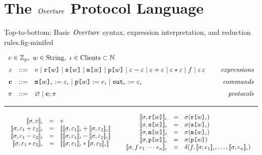 \section{The $\mathit{Overture}$ Protocol Language}

\begin{fpfig}[t]{Top-to-bottom: Basic $\mathit{Overture}$ syntax, expression interpretation, and reduction rules.}{fig-minifed}
  {
    $$
    \begin{array}{rcl@{\hspace{8mm}}r}
      \multicolumn{4}{l}{v \in \mathbb{Z}_p,\ w \in \mathrm{String},\ \cid \in \mathrm{Clients} \subset  \mathbb{N} }\\[2mm] %
      \be &::=& v \mid \flip{w} \mid \secret{w} \mid \mesg{w} \mid \rvl{w} \mid \be \fminus \be \mid \be \fplus \be \mid \be \ftimes \be \mid f \mid \be\,\be & \textit{expressions}\\[2mm]
      \instr &::=& \eassign{\mesg{w}}{\cid}{\be}{\cid} \mid
      \reveal{w}{e}{\cid} \mid \pubout{\cid}{\be}{\cid} & \textit{commands} \\[2mm]
      \prog &::=& \varnothing \mid \instr; \prog & \textit{protocols}
    \end{array}
    $$
  
  \rule{130mm}{0.5pt}

  $$
  \begin{array}{c@{\hspace{5mm}}c}
  \begin{array}{rcl}
    \lcod{\store, v}{\cid} &=& v\\
    \lcod{\store, \be_1 \fplus \be_2}{\cid} &=& \fcod{\lcod{\store, \be_1}{\cid} \fplus \lcod{\store, \be_2}{\cid}}\\ 
    \lcod{\store, \be_1 \fminus \be_2}{\cid} &=& \fcod{\lcod{\store, \be_1}{\cid} \fminus \lcod{\store, \be_2}{\cid}}\\ 
    \lcod{\store, \be_1 \ftimes \be_2}{\cid} &=& \fcod{\lcod{\store, \be_1}{\cid} \ftimes \lcod{\store, \be_2}{\cid}}
  \end{array} & 
  \begin{array}{rcl}
    \lcod{\store, \flip{w}}{\cid} &=& \store(\elab{\flip{w}}{\cid})\\
    \lcod{\store, \secret{w}}{\cid} &=& \store(\elab{\secret{w}}{\cid})\\
    \lcod{\store, \mesg{w}}{\cid} &=& \store(\elab{\mesg{w}}{\cid})\\
    \lcod{\store, \rvl{w}}{\cid} &=& \store(\rvl{w})\\
    \lcod{\store, f\,e_1\,\cdots\, e_n}{\cid} &=& \delta(f,\lcod{\store, e_1}{\cid},\ldots,\lcod{\store,e_n}{\cid})
  \end{array}
  \end{array}
  $$

}
\end{fpfig}
